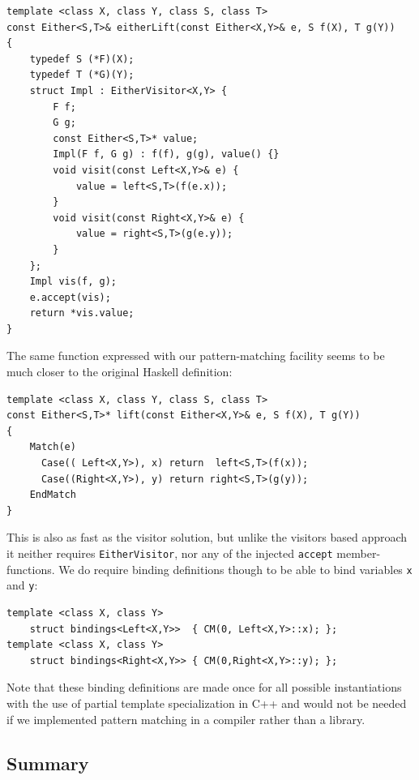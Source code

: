 \documentclass[preprint]{sigplanconf}
\makeatletter
\DeclareRobustCommand{\code}[1]{{\lstinline[breaklines=false,escapechar=@]{#1}}}
\makeatother
\begin{document}
\begin{lstlisting}
template <class X, class Y, class S, class T>
const Either<S,T>& eitherLift(const Either<X,Y>& e, S f(X), T g(Y))
{
    typedef S (*F)(X);
    typedef T (*G)(Y);
    struct Impl : EitherVisitor<X,Y> {
        F f;
        G g;
        const Either<S,T>* value;
        Impl(F f, G g) : f(f), g(g), value() {}
        void visit(const Left<X,Y>& e) {
            value = left<S,T>(f(e.x));
        }
        void visit(const Right<X,Y>& e) {
            value = right<S,T>(g(e.y));
        }
    };
    Impl vis(f, g);
    e.accept(vis);
    return *vis.value;
}
\end{lstlisting}

\noindent
The same function expressed with our pattern-matching facility seems to be much 
closer to the original Haskell definition:

\begin{lstlisting}[keepspaces,columns=flexible]
template <class X, class Y, class S, class T>
const Either<S,T>* lift(const Either<X,Y>& e, S f(X), T g(Y))
{
    Match(e)
      Case(( Left<X,Y>), x) return  left<S,T>(f(x));
      Case((Right<X,Y>), y) return right<S,T>(g(y));
    EndMatch
}
\end{lstlisting}

\noindent
This is also as fast as the visitor solution, but unlike the visitors based 
approach it neither requires \code{EitherVisitor}, nor any of the injected 
\code{accept} member-functions. We do require binding definitions though to be 
able to bind variables \code{x} and \code{y}:


\begin{lstlisting}[keepspaces,columns=flexible]
template <class X, class Y> 
    struct bindings<Left<X,Y>>  { CM(0, Left<X,Y>::x); };
template <class X, class Y> 
    struct bindings<Right<X,Y>> { CM(0,Right<X,Y>::y); };
\end{lstlisting}

\noindent
Note that these binding definitions are made once for all possible instantiations 
with the use of partial template specialization in C++ and would not be needed 
if we implemented pattern matching in a compiler rather than a library.

\subsection{Summary}
\end{document}
